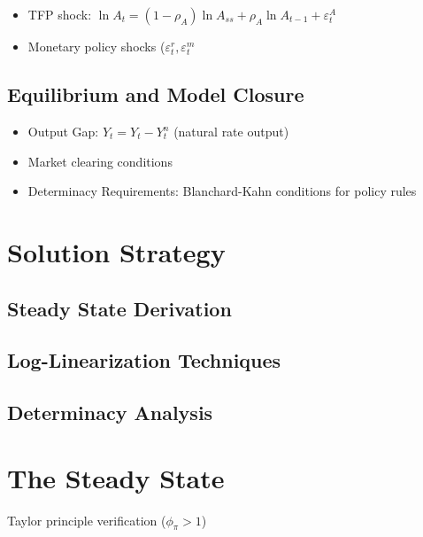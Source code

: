 \documentclass[11pt,preprint]{elsarticle}
\numberwithin{equation}{section}
\numberwithin{figure}{section}
\numberwithin{table}{section}
\begin{document}
\begin{itemize}
\item
  TFP shock:
  \(\ln A_t = (1-\rho_A)\ln A_{ss} + \rho_A \ln A_{t-1} + \varepsilon_t^A\)
\item
  Monetary policy shocks (\(\varepsilon_t^r, \varepsilon_t^m\)
\end{itemize}

\subsection{Equilibrium and Model
Closure}\label{equilibrium-and-model-closure}

\begin{itemize}
\item
  Output Gap: \(\hat{Y}_t = Y_t - Y_t^n\) (natural rate output)
\item
  Market clearing conditions
\item
  Determinacy Requirements: Blanchard-Kahn conditions for policy rules
\end{itemize}

\section{Solution Strategy}\label{solution-strategy}

\subsection{Steady State Derivation}\label{steady-state-derivation}

\subsection{Log-Linearization
Techniques}\label{log-linearization-techniques}

\subsection{Determinacy Analysis}\label{determinacy-analysis}

\section{The Steady State}\label{the-steady-state}

Taylor principle verification (\(\phi_\pi > 1\))
\end{document}
